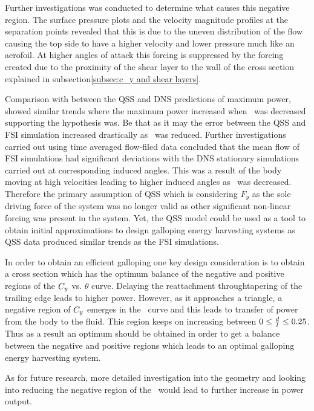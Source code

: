 Further investigations was conducted to determine what causes this negative region. The surface pressure plots and the velocity magnitude profiles at the separation points revealed that this is due to the uneven distribution of the flow causing the top side to have a higher velocity and lower pressure much like an aerofoil. At higher angles of attack this forcing is suppressed by the forcing created due to the proximity of the shear layer to the wall of the cross section explained in  subsection\ref{subsec:c_y and shear layers}.

Comparison with between the QSS and DNS predictions of maximum power,  showed similar trends where the maximum power increased when \ratio\ was decreased supporting the hypothesis was. Be that as it may the error between the QSS and FSI simulation increased drastically as \ratio\ was reduced. Further investigations carried out using time averaged flow-filed data concluded that the mean flow of FSI simulations had significant deviations with the DNS stationary simulations carried out at corresponding induced angles. This was a result of the body moving at high velocities leading to higher induced angles as \ratio\ was decreased. Therefore the primary assumption of QSS which is considering $F_y$ as the sole driving force of the system was no longer valid as other significant non-linear forcing was present in the system. Yet, the QSS model could be used as a tool to obtain initial approximations to design galloping energy harvesting systems as QSS data produced similar trends as the FSI simulations.

In order to obtain an efficient galloping one key design consideration is to obtain a cross section which has the optimum balance of the negative and positive regions of the $C_{y}$ vs. $\theta$ curve. Delaying the reattachment throughtapering of the trailing edge leads to higher power. However, as it approaches a triangle, a negative region of $C_{y}$ emerges in the \cy\ curve and this leads to transfer of power from the body to the fluid. This region keeps on increasing between $0\leq\frac{d}{l}\leq0.25$. Thus as a result an optimum \ratio should be obtained in order to get a balance between the negative and positive regions which leads to an optimal galloping energy harvesting system. 

As for future research, more detailed investigation into the geometry and looking into reducing the negative region of the \cy\ would lead to further increase in power output. 

 

      




